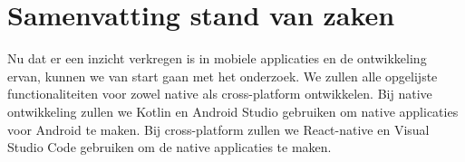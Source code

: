 
\section{Samenvatting stand van zaken}
Nu dat er een inzicht verkregen is in mobiele applicaties en de ontwikkeling ervan, 
kunnen we van start gaan met het onderzoek. We zullen alle opgelijste functionaliteiten 
voor zowel native als cross-platform ontwikkelen. Bij native ontwikkeling zullen we 
Kotlin en Android Studio gebruiken om native applicaties voor Android te maken. 
Bij cross-platform zullen we React-native en Visual Studio Code gebruiken om de 
native applicaties te maken.














